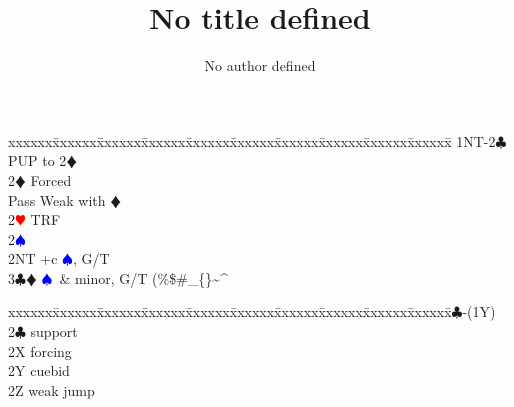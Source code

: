 \documentclass[a4paper]{article}
\title{No title defined}
\author{No author defined}
\newcommand{\BC}{\textcolor{OliveGreen}{$\clubsuit$}}
\newcommand{\BD}{\textcolor{RedOrange}{$\vardiamondsuit$}}
\newcommand{\BH}{\textcolor{Red}{$\varheartsuit${}}}
\newcommand{\BS}{\textcolor{Blue}{$\spadesuit${}}}
\newenvironment{bidtable}
{\begin{tabbing}

xxxxxx\=xxxxxx\=xxxxxx\=xxxxxx\=xxxxxx\=xxxxxx\=xxxxxx\=xxxxxx\=xxxxxx\=xxxxxx\=\kill}
{\end{tabbing} }%
\begin{document}
\maketitle
\tableofcontents

\begin{bidtable}
1NT-2\BC \> PUP to 2\BD \+\\
2\BD \> Forced\+\\
Pass \> Weak with \BD \\
2\BH \> TRF\+\\
2\BS\+\\
2NT +c \BS , G/T\\
3\BC\BD \> \BS\ \& minor, G/T (\%\$\#\_\{\}\textasciitilde\textasciicircum\)\-\-\-\-
\end{bidtable}
\bigbreak
\begin{bidtable}
1\BC-(1Y)\+\\
2\BC \> support\\
2X \> forcing\\
2Y \> cuebid\\
2Z \> weak jump\-
\end{bidtable}
\bigbreak
\end{document}
